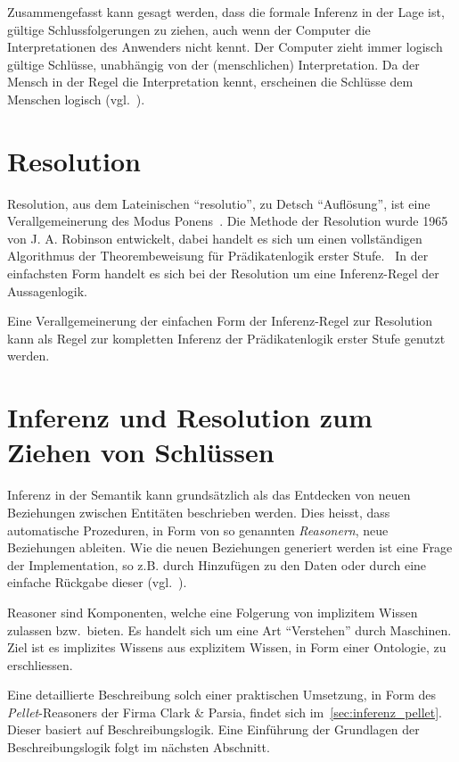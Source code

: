 Zusammengefasst kann gesagt werden, dass die formale Inferenz in der Lage ist, gültige Schlussfolgerungen zu ziehen, auch wenn der Computer die Interpretationen des Anwenders nicht kennt. Der Computer zieht immer logisch gültige Schlüsse, unabhängig von der (menschlichen) Interpretation. Da der Mensch in der Regel die Interpretation kennt, erscheinen die Schlüsse dem Menschen logisch (vgl.~\cite[S. 165]{russel}).

\section{Resolution}
\label{sec:resolution}

Resolution, aus dem Lateinischen ``resolutio'', zu Detsch ``Auflösung'', ist eine Verallgemeinerung des Modus Ponens~\cite[S. 279]{russel}. Die Methode der Resolution wurde 1965 von J. A. Robinson entwickelt, dabei handelt es sich um einen vollständigen Algorithmus der Theorembeweisung für Prädikatenlogik erster Stufe.~\cite[S. 18]{russel} In der einfachsten Form handelt es sich bei der Resolution um eine Inferenz-Regel der Aussagenlogik.~\cite[S. 277]{russel}

Eine Verallgemeinerung der einfachen Form der Inferenz-Regel zur Resolution kann als Regel zur kompletten Inferenz der Prädikatenlogik erster Stufe genutzt werden.~\cite[S. 278]{russel}

\section{Inferenz und Resolution zum Ziehen von Schlüssen}
\label{sec:inferenz_praktisch}
Inferenz in der Semantik kann grundsätzlich als das Entdecken von neuen Beziehungen zwischen Entitäten beschrieben werden. Dies heisst, dass automatische Prozeduren, in Form von so genannten \textit{Reasonern}, neue Beziehungen ableiten. Wie die neuen Beziehungen generiert werden ist eine Frage der Implementation, so z.B. durch Hinzufügen zu den Daten oder durch eine einfache Rückgabe dieser (vgl.~\cite[Abschnitt 1]{w3inference}).

Reasoner sind Komponenten, welche eine Folgerung von implizitem Wissen zulassen bzw.\ bieten. Es handelt sich um eine Art ``Verstehen'' durch Maschinen. Ziel ist es implizites Wissens aus explizitem Wissen, in Form einer Ontologie, zu erschliessen.

Eine detaillierte Beschreibung solch einer praktischen Umsetzung, in Form des \textit{Pellet}-Reasoners der Firma Clark \& Parsia, findet sich im~\autoref{sec:inferenz_pellet}. Dieser basiert auf Beschreibungslogik.  Eine Einführung der Grundlagen der Beschreibungslogik folgt im nächsten Abschnitt.

